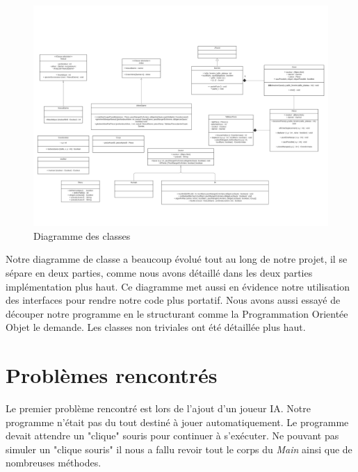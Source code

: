 \documentclass[12,french]{report}
\begin{document}
\begin{figure}[H]
	\center
	\includegraphics[width=1\textwidth]{./Images/Diagramme_classe}
	\caption{Diagramme des classes}
\end{figure}\vspace{0.2cm}


Notre diagramme de classe a beaucoup évolué tout au long de notre projet, il se sépare en deux parties, comme nous avons détaillé dans les deux parties implémentation plus haut.
Ce diagramme met aussi en évidence notre utilisation des interfaces pour rendre notre code plus portatif. Nous avons aussi essayé de découper notre programme en le structurant comme la Programmation Orientée Objet le demande. Les classes non triviales ont été détaillée plus haut.



\chapter{Problèmes rencontrés}

Le premier problème rencontré est lors de l'ajout d'un joueur IA. Notre programme n'était pas du tout destiné à jouer automatiquement. Le programme devait attendre un "clique" souris pour continuer à s'exécuter. Ne pouvant pas simuler un "clique souris" il nous a fallu revoir tout le corps du \textit{Main} ainsi que de nombreuses méthodes.\\
\end{document}
